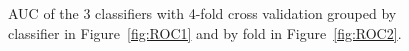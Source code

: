 \documentclass[a4paper,11pt]{article}
\begin{document}
\begin{figure}[!h]
	\centering
	\caption{AUC of the 3 classifiers with 4-fold cross validation grouped by classifier in Figure~\ref{fig:ROC1} and by fold in Figure~\ref{fig:ROC2}.}
	\label{fig:RealROC}
\end{figure}
\end{document}
